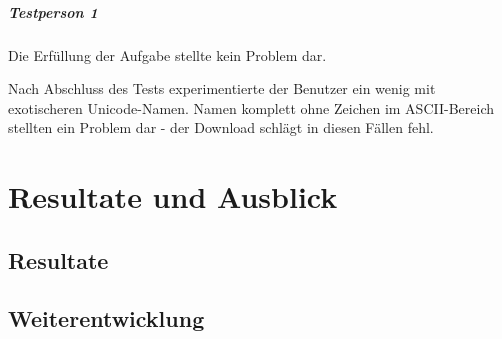 \paragraph{Testperson 1}
Die Erfüllung der Aufgabe stellte kein Problem dar.

Nach Abschluss des Tests experimentierte der Benutzer ein wenig mit exotischeren Unicode-Namen. Namen komplett ohne Zeichen im ASCII-Bereich stellten ein Problem dar - der Download schlägt in diesen Fällen fehl. 
\chapter{Resultate und Ausblick}

\section{Resultate}


\section{Weiterentwicklung}


